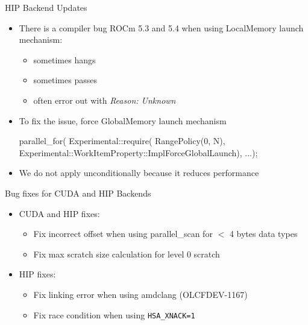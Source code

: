 
\begin{frame}[fragile]{HIP Backend Updates}
  \begin{itemize}
    \item There is a compiler bug ROCm 5.3 and 5.4 when using LocalMemory launch mechanism: 
      \begin{itemize}
        \item sometimes hangs
        \item sometimes passes
        \item often error out with \emph{Reason: Unknown}
      \end{itemize}
    \item To fix the issue, force GlobalMemory launch mechanism
\begin{code}[keywords={ImplForceGlobalLaunch}]
parallel_for(
  Experimental::require(
    RangePolicy(0, N),
    Experimental::WorkItemProperty::ImplForceGlobalLaunch),
  ...);
\end{code}
    \item We do not apply unconditionally because it reduces performance
  \end{itemize}
\end{frame}


\begin{frame}[fragile]{Bug fixes for CUDA and HIP Backends}
  \begin{itemize}
     \item CUDA and HIP fixes:
       \begin{itemize}
         \item Fix incorrect offset when using parallel\_scan for $<$ 4 bytes data
           types
         \item Fix max scratch size calculation for level 0 scratch
       \end{itemize}
     \item HIP fixes:
       \begin{itemize}
         \item Fix linking error when using amdclang (OLCFDEV-1167)
         \item Fix race condition when using \texttt{HSA\_XNACK=1}
       \end{itemize}
  \end{itemize}
\end{frame}

